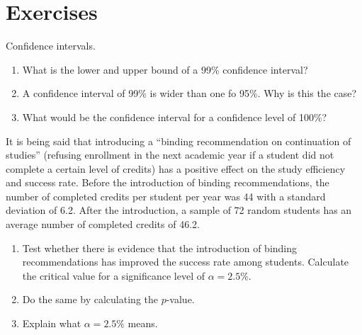 \section{Exercises}
\label{sec:hypothesis-tests-exercises}

\begin{exercise}
  Confidence intervals.
  
  \begin{enumerate}
    \item What is the lower and upper bound of a 99\% confidence interval?
    \item A confidence interval of 99\% is wider than one fo 95\%. Why is this the case?
    \item What would be the confidence interval for a confidence level of 100\%?
  \end{enumerate}
  
\end{exercise}

\begin{exercise}
  \label{ex:binding-recommendation}
  
  It is being said that introducing a ``binding recommendation on continuation of studies'' (refusing enrollment in the next academic year if a student did not complete a certain level of credits) has a positive effect on the study efficiency and success rate. Before the introduction of binding recommendations, the number of completed credits per student per year was 44 with a standard deviation of 6.2. After the introduction, a sample of 72 random students has an average number of completed credits of 46.2.
  
  \begin{enumerate}
    \item Test whether there is evidence that the introduction of binding recommendations has improved the success rate among students. Calculate the critical value for a significance level of $\alpha = 2.5\%$.
    \item Do the same by calculating the $p$-value.
    \item Explain what $\alpha = 2.5 \%$ means.
  \end{enumerate}
\end{exercise}

